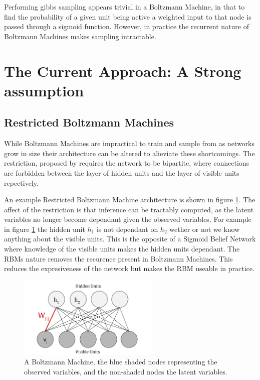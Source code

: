   Performing gibbs sampling appears trivial in a Boltzmann Machine, in that to find the probability of a given unit being active a weighted input to that node is passed through a sigmoid function. However, in practice the recurrent nature of Boltzmann Machines makes sampling intractable.



  \section{The Current Approach: A Strong assumption}

  \subsection{Restricted Boltzmann Machines}

  While Boltzmann Machines are impractical to train and sample from as networks grow in size  their architecture can be altered to alieviate these shortcomings. The restriction, proposed by  requires the network to be bipartite, where connections are forbidden between the layer of hidden units and the layer of visible units repectively.

  An example Restricted Boltzmann Machine architecture is shown in figure \ref{F:Restricted-Boltzmann-Machine}. The affect of the restriction is that inference can be tractably computed, as the latent variables no longer become dependant given the observed variables. For example in figure \ref{F:Restricted-Boltzmann-Machine} the hidden unit $h_1$ is not dependant on $h_2$ wether or not we know anything about the visible units. This is the opposite of a Sigmoid Belief Network where knowledge of the visible units makes the hidden units dependant. The RBMs nature removes the recurence present in Boltzmann Machines. This reduces the expresiveness of the network but makes the RBM useable in practice. 

  \begin{figure}[h]
  \begin{center}
    \includegraphics[width = 0.6\textwidth]{Assets/RBM_Example.png}
  \caption{A Boltzmann Machine, the blue shaded nodes representing the observed variables, and the non-shaded nodes the latent variables.}
  \label{F:Restricted-Boltzmann-Machine}
  \end{center}
  \end{figure}


